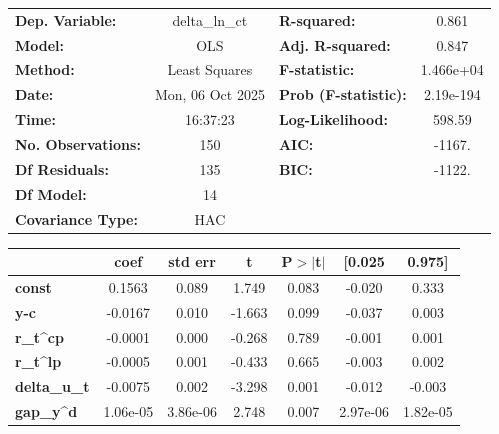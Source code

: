 \begin{center}
\begin{tabular}{lclc}
\toprule
\textbf{Dep. Variable:}    &  delta\_ln\_ct   & \textbf{  R-squared:         } &     0.861   \\
\textbf{Model:}            &       OLS        & \textbf{  Adj. R-squared:    } &     0.847   \\
\textbf{Method:}           &  Least Squares   & \textbf{  F-statistic:       } & 1.466e+04   \\
\textbf{Date:}             & Mon, 06 Oct 2025 & \textbf{  Prob (F-statistic):} & 2.19e-194   \\
\textbf{Time:}             &     16:37:23     & \textbf{  Log-Likelihood:    } &    598.59   \\
\textbf{No. Observations:} &         150      & \textbf{  AIC:               } &    -1167.   \\
\textbf{Df Residuals:}     &         135      & \textbf{  BIC:               } &    -1122.   \\
\textbf{Df Model:}         &          14      & \textbf{                     } &             \\
\textbf{Covariance Type:}  &       HAC        & \textbf{                     } &             \\
\bottomrule
\end{tabular}
\begin{tabular}{lcccccc}
                     & \textbf{coef} & \textbf{std err} & \textbf{t} & \textbf{P$> |$t$|$} & \textbf{[0.025} & \textbf{0.975]}  \\
\midrule
\textbf{const}       &       0.1563  &        0.089     &     1.749  &         0.083        &       -0.020    &        0.333     \\
\textbf{y-c}         &      -0.0167  &        0.010     &    -1.663  &         0.099        &       -0.037    &        0.003     \\
\textbf{r\_t^cp}     &      -0.0001  &        0.000     &    -0.268  &         0.789        &       -0.001    &        0.001     \\
\textbf{r\_t^lp}     &      -0.0005  &        0.001     &    -0.433  &         0.665        &       -0.003    &        0.002     \\
\textbf{delta\_u\_t} &      -0.0075  &        0.002     &    -3.298  &         0.001        &       -0.012    &       -0.003     \\
\textbf{gap\_y^d}    &     1.06e-05  &     3.86e-06     &     2.748  &         0.007        &     2.97e-06    &     1.82e-05     \\

\end{tabular}
\end{center}
